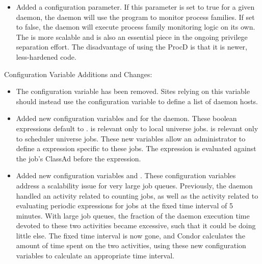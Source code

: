 \begin{itemize}
\item Added a  configuration parameter. If this
parameter is set to true for a given daemon, the daemon will use the
 program to monitor process families. If set to false,
the daemon will execute process family monitoring logic on its
own. The  is more scalable and is also an essential
piece in the ongoing privilege separation effort. The disadvantage of
using the ProcD is that it is newer, less-hardened code.

\end{itemize}

\noindent Configuration Variable Additions and Changes:

\begin{itemize}

\item The  configuration variable has
  been removed.
  Sites relying on this variable should instead use the configuration
  variable  to
  define a list of  daemon hosts.

\item Added new configuration variables 
  and  for the  daemon.
  These boolean expressions default to .
   is relevant only to local universe jobs.
   is relevant only to scheduler 
  universe jobs.
  These new variables allow an administrator to define
  a  expression specific to these jobs. 
  The expression is evaluated
  against the job's ClassAd before the  expression.

\item Added new configuration variables 
  and .  These configuration variables
  address a scalability issue for very large job queues.
  Previously, the  daemon handled an activity related
  to counting jobs, as well as the activity related to evaluating
  periodic expressions for jobs at the fixed time interval of 5 minutes.
  With large job queues, the fraction of the  daemon
  execution time devoted to these two activities became excessive,
  such that it could be doing little else.
  The fixed time interval is now gone, and Condor calculates the amount
  of time spent on the two activities, using these new configuration
  variables to calculate an appropriate time interval.
  

\end{itemize}
